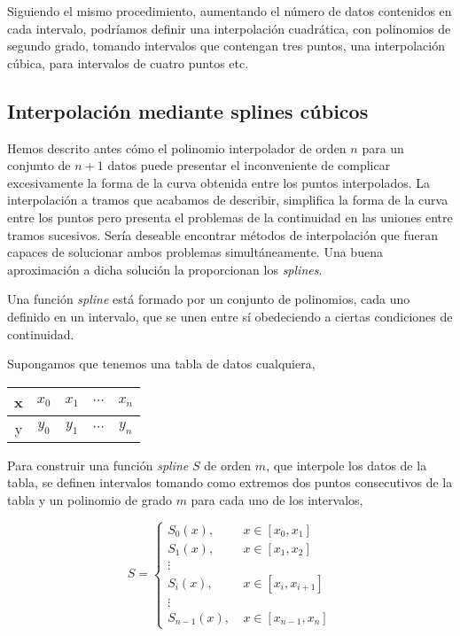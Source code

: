 Siguiendo el mismo procedimiento, aumentando el número de datos contenidos en cada intervalo, podríamos definir una interpolación cuadrática, con polinomios de segundo grado, tomando intervalos que contengan tres puntos, una interpolación cúbica, para intervalos de cuatro puntos etc.

\subsection{Interpolación mediante splines cúbicos} 
Hemos descrito antes cómo el polinomio interpolador de orden $n$ para un conjunto de $n+1$ datos puede presentar el inconveniente de complicar excesivamente la forma de  la curva obtenida entre los puntos interpolados. La interpolación a tramos que acabamos de describir, simplifica la forma de la curva entre los puntos pero presenta el problemas de la continuidad en las uniones entre tramos sucesivos. Sería deseable encontrar métodos de interpolación que fueran capaces de solucionar ambos problemas simultáneamente. Una buena aproximación a dicha solución la proporcionan los \emph{splines}.

Una función \emph{spline} está formado por un conjunto de polinomios, cada uno definido en un intervalo, que se unen entre sí obedeciendo a ciertas condiciones de continuidad.

Supongamos que tenemos una tabla de datos cualquiera,

\begin{table}[h]
\centering
\begin{tabular}{c|cccc}
x&$x_0$&$x_1$&$\cdots$&$x_n$\\
\hline
y&$y_0$&$y_1$&$\cdots$&$y_n$
\end{tabular}
\end{table}

Para construir una función \emph{spline} $S$ de orden $m$, que interpole los datos de la tabla, se definen intervalos tomando como extremos dos puntos consecutivos de la tabla y un polinomio de grado $m$ para cada uno de los intervalos,

\begin{equation*}
S= \left\{ 
\begin{aligned}
S_0(x),& \ x\in [x_0,x_1]\\
S_1(x),& \ x\in [x_1,x_2]\\
\vdots \\
S_i(x),& \ x\in [x_i,x_{i+1}]\\
\vdots \\
S_{n-1}(x),& \ x\in [x_{n-1},x_n]
\end{aligned}
\right.
\end{equation*}

